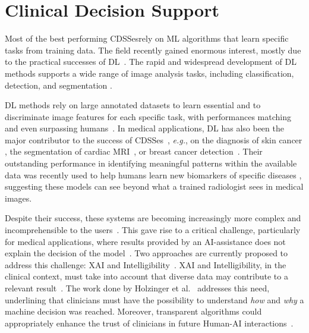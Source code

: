 \section{Clinical Decision Support}
\label{sec:sec003003}

Most of the best performing \acp{CDSSe}\footnotemark[8] rely on \ac{ML} algorithms that learn specific tasks from training data.
The field recently gained enormous interest, mostly due to the practical successes of \ac{DL}~\cite{meacham2019towards}.
The rapid and widespread development of \ac{DL} methods supports a wide range of image analysis tasks, including classification, detection, and segmentation \cite{lecun2015deep}.


\ac{DL} methods rely on large annotated datasets to learn essential and to discriminate image features for each specific task, with performances matching and even surpassing humans~\cite{esteva2017dermatologist, McKinney2020}.
In medical applications, \ac{DL} has also been the major contributor to the success of \acp{CDSSe}~\cite{esteva2019guide}, {\it e.g.}, on the diagnosis of skin cancer \cite{esteva2017dermatologist}, the segmentation of cardiac \ac{MRI}~\cite{medley2019segmenting}, or breast cancer detection~\cite{MAICAS2019101562}.
Their outstanding performance in identifying meaningful patterns within the available data was recently used to help humans learn new biomarkers of specific diseases \cite{cole2017predicting, gonzalez2018deep, wang2019deep}, suggesting these models can see beyond what a trained radiologist sees in medical images.

Despite their success, these systems are becoming increasingly more complex and incomprehensible to the users~\cite{holzinger2019causability}.
This gave rise to a critical challenge, particularly for medical applications, where results provided by an \ac{AI}-assistance does not explain the decision of the model~\cite{shah2019artificial}.
Two approaches are currently proposed to address this challenge: \ac{XAI} and Intelligibility~\cite{gunning2017explainable, miller2018explanation}.
\ac{XAI} and Intelligibility, in the clinical context, must take into account that diverse data may contribute to a relevant result~\cite{Bharadhwaj:2019:ERS:3308557.3308699}.
The work done by Holzinger et al.~\cite{holzinger2018current} addresses this need, underlining that clinicians must have the possibility to understand {\it how} and {\it why} a machine decision was reached.
Moreover, transparent algorithms could appropriately enhance the trust of clinicians in future Human-AI interactions~\cite{Dominguez:2019:EEA:3301275.3302274, Weisz:2019:BTS:3301275.3302290}.

